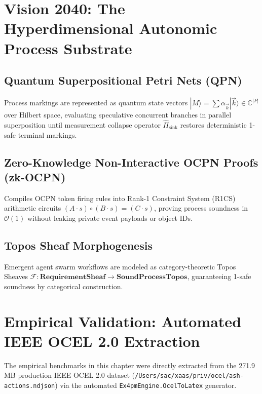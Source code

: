 \documentclass[11pt,a4paper,oneside]{book}
\theoremstyle{definition}
\begin{document}
\chapter{Vision 2040: The Hyperdimensional Autonomic Process Substrate}

\section{Quantum Superpositional Petri Nets (QPN)}
Process markings are represented as quantum state vectors $|M\rangle = \sum \alpha_{\vec{k}} |\vec{k}\rangle \in \mathbb{C}^{|P|}$ over Hilbert space, evaluating speculative concurrent branches in parallel superposition until measurement collapse operator $\hat{\Pi}_{\text{sink}}$ restores deterministic 1-safe terminal markings.

\section{Zero-Knowledge Non-Interactive OCPN Proofs (zk-OCPN)}
Compiles OCPN token firing rules into Rank-1 Constraint System (R1CS) arithmetic circuits $(A \cdot s) \circ (B \cdot s) = (C \cdot s)$, proving process soundness in $\mathcal{O}(1)$ without leaking private event payloads or object IDs.

\section{Topos Sheaf Morphogenesis}
Emergent agent swarm workflows are modeled as category-theoretic Topos Sheaves $\mathcal{F} : \mathbf{RequirementSheaf} \to \mathbf{SoundProcessTopos}$, guaranteeing 1-safe soundness by categorical construction.

\chapter{Empirical Validation: Automated IEEE OCEL 2.0 Extraction}

The empirical benchmarks in this chapter were directly extracted from the 271.9 MB production IEEE OCEL 2.0 dataset (\texttt{/Users/sac/xaas/priv/ocel/ash-actions.ndjson}) via the automated \texttt{Ex4pmEngine.OcelToLatex} generator.


\end{document}
